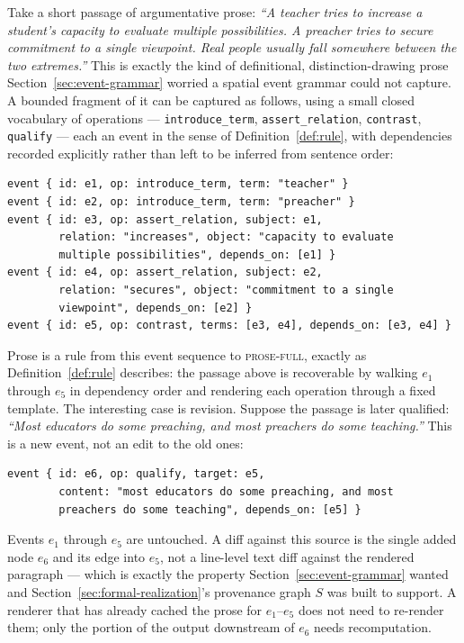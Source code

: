 \documentclass[11pt]{article}
\theoremstyle{definition}
\begin{document}
Take a short passage of argumentative prose: \emph{``A teacher tries to increase a student's capacity to evaluate multiple possibilities. A preacher tries to secure commitment to a single viewpoint. Real people usually fall somewhere between the two extremes.''} This is exactly the kind of definitional, distinction-drawing prose Section~\ref{sec:event-grammar} worried a spatial event grammar could not capture. A bounded fragment of it can be captured as follows, using a small closed vocabulary of operations --- \texttt{introduce\_term}, \texttt{assert\_relation}, \texttt{contrast}, \texttt{qualify} --- each an event in the sense of Definition~\ref{def:rule}, with dependencies recorded explicitly rather than left to be inferred from sentence order:

\begin{verbatim}
event { id: e1, op: introduce_term, term: "teacher" }
event { id: e2, op: introduce_term, term: "preacher" }
event { id: e3, op: assert_relation, subject: e1,
        relation: "increases", object: "capacity to evaluate
        multiple possibilities", depends_on: [e1] }
event { id: e4, op: assert_relation, subject: e2,
        relation: "secures", object: "commitment to a single
        viewpoint", depends_on: [e2] }
event { id: e5, op: contrast, terms: [e3, e4], depends_on: [e3, e4] }
\end{verbatim}

Prose is a rule from this event sequence to \textsc{prose-full}, exactly as Definition~\ref{def:rule} describes: the passage above is recoverable by walking $e_1$ through $e_5$ in dependency order and rendering each operation through a fixed template. The interesting case is revision. Suppose the passage is later qualified: \emph{``Most educators do some preaching, and most preachers do some teaching.''} This is a new event, not an edit to the old ones:

\begin{verbatim}
event { id: e6, op: qualify, target: e5,
        content: "most educators do some preaching, and most
        preachers do some teaching", depends_on: [e5] }
\end{verbatim}

Events $e_1$ through $e_5$ are untouched. A diff against this source is the single added node $e_6$ and its edge into $e_5$, not a line-level text diff against the rendered paragraph --- which is exactly the property Section~\ref{sec:event-grammar} wanted and Section~\ref{sec:formal-realization}'s provenance graph $S$ was built to support. A renderer that has already cached the prose for $e_1$--$e_5$ does not need to re-render them; only the portion of the output downstream of $e_6$ needs recomputation.
\end{document}
